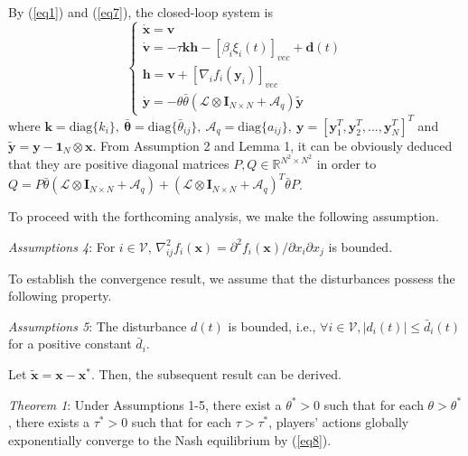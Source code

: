 \documentclass[lettersize,journal]{IEEEtran}
\begin{document}
By (\ref{eq1}) and (\ref{eq7}), the closed-loop system is
\begin{equation}\label{eq8}
    \begin{cases}
        \dot{\mathbf{x}}=\mathbf{v}                                                      \\
        \dot{\mathbf{v}}=-\tau\mathbf{k}\mathbf{h}-[\beta_i\xi_i(t)]_{vec}+\mathbf{d}(t) \\
        \mathbf{h}=\mathbf{v}+[\nabla_if_i(\mathbf{y}_i)]_{vec}                          \\
        \dot{\mathbf{y}}=-\theta\bar{\theta}(\mathcal{L}\otimes\mathbf{I}_{N\times N}+\mathcal{A}_q)\tilde{\mathbf{y}}
    \end{cases}
\end{equation}
where $\mathbf{k} = \text{diag}\{k_i\},~
    \bar{\mathbf{\theta}} = \text{diag}\{\bar{\theta}_{ij}\},~
    \mathcal{A}_q = \text{diag}\{a_{ij}\}, ~\mathbf{y} = [\mathbf{y}_1^T,\mathbf{y}_2^T,...,\mathbf{y}_N^T]^T$ and $\tilde{\mathbf{y}} = \mathbf{y} - \mathbf{1}_N \otimes \mathbf{x}$. From Assumption 2 and Lemma 1, it can be obviously deduced that they are positive diagonal matrices $P,Q\in\mathbb{R}^{N^{2}\times N^{2}}$ in order to $Q = P\bar{\theta}(\mathcal{L}\otimes\mathbf{I}_{N\times N}+\mathcal{A}_q)+(\mathcal{L}\otimes\mathbf{I}_{N\times N}+\mathcal{A}_q)^T\bar{\theta}P$.

To proceed with the forthcoming analysis, we make the following assumption.

\emph{Assumptions 4}: For $i \in \mathcal{V}$, $\nabla_{ij}^{2}f_{i}(\mathbf{x})=\partial^{2}f_{i}(\mathbf{x})/\partial x_{i}\partial x_{j}$ is bounded.

To establish the convergence result, we assume that the disturbances possess the following property.

\emph{Assumptions 5}: The disturbance $d(t)$ is bounded, i.e., $\forall i \in \mathcal{V}, |d_i(t)|\leq \bar{d}_i(t)$ for a positive constant $\bar{d}_i$.

Let $\tilde{\mathbf{x}} = \mathbf{x} - \mathbf{x}^*$. Then, the subsequent result can be derived.

\emph{Theorem 1}: Under Assumptions 1-5, there exist a $\theta^* > 0$ such that for each $\theta > \theta^*$, there exists a $\tau^* > 0$ such that for each $\tau > \tau^*$, players' actions globally exponentially converge to the Nash equilibrium by (\ref{eq8}).
\end{document}
